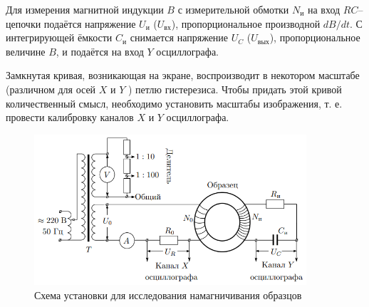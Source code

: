 \documentclass[a4paper,12pt]{article}
\begin{document}
Для измерения магнитной индукции $B$ с измерительной обмотки $N_и$ на вход $RC$--цепочки подаётся напряжение $U_и$ ($U_{вх}$), пропорциональное производной $dB / dt$. С интегрирующей ёмкости $C_и$ снимается напряжение $U_C$ ($U_{вых}$), пропорциональное величине $B$, и подаётся на вход $Y$ осциллографа.

Замкнутая кривая, возникающая на экране, воспроизводит в некотором масштабе (различном для осей $X$ и $Y$ ) петлю гистерезиса. Чтобы придать этой кривой количественный смысл, необходимо установить масштабы изображения, т. е. провести калибровку каналов $X$ и $Y$ осциллографа.


\begin{figure}[H]\label{fig: Установка}
    \centering
    \includegraphics[width = 0.9\textwidth]{Установка.png}
    \caption{ Схема установки для исследования намагничивания образцов}
\end{figure}
\end{document}
